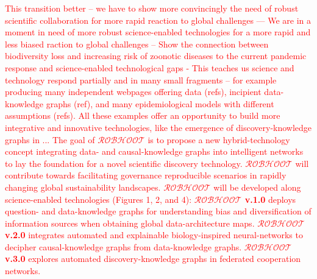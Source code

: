 \documentclass[11pt, a4paper]{article} %
\begin{document}
  \textcolor{red}{This transition better -- we have to show more
    convincingly the need of robust scientific collaboration for more
    rapid reaction to global challenges --- We are in a moment in need
    of more robust science-enabled technologies for a more rapid and
    less biased raction to global challenges -- Show the connection
    between biodiversity loss and increasing risk of zoonotic diseases
    to the current pandemic response and science-enabled technological
    gaps - This teaches us science and technology respond partially
    and in many small fragments -- for example producing many
    independent webpages offering data (refs), incipient
    data-knowledge graphs (ref), and many epidemiological models with
    different assumptions (refs). All these examples offer an
    opportunity to build more integrative and innovative technologies,
    like the emergence of discovery-knowledge graphs in ... The goal
    of $\mathcal{ROBHOOT}$ is to propose a new hybrid-technology
    concept integrating data- and causal-knowledge graphs into
    intelligent networks to lay the foundation for a novel scientific
    discovery technology. $\mathcal{ROBHOOT}$ will contribute towards
    facilitating governance reproducible scenarios in rapidly changing
    global sustainability landscapes. $\mathcal{ROBHOOT}$ will be
    developed along science-enabled technologies (Figures 1, 2, and
    4): {\bf $\mathcal{ROBHOOT}$ v.1.0} deploys question- and
    data-knowledge graphs for understanding bias and diversification
    of information sources when obtaining global data-architecture
    maps. {\bf $\mathcal{ROBHOOT}$ v.2.0} integrates automated and
    explainable biology-inspired neural-networks to decipher
    causal-knowledge graphs from data-knowledge graphs. {\bf
      $\mathcal{ROBHOOT}$ v.3.0} explores automated
    discovery-knowledge graphs in federated cooperation networks.}
\end{document}
